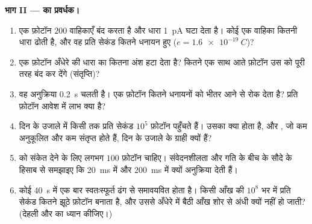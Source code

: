 \begin{problem}
\medskip
\noindent\textbf{भाग II ---  का प्रवर्धक।}
\begin{enumerate}[resume]
  \item एक फ़ोटॉन $200$ वाहिकाएँ बंद करता है और धारा \qty{1}{pA} घटा
        देता है। कोई एक वाहिका कितनी धारा ढोती है, और वह प्रति सेकंड
        कितने धनायन हुए ($e = \qty{1.6e-19}{C}$)?
  \item एक फ़ोटॉन अँधेरे की धारा का कितना अंश हटा देता है? कितने एक साथ
        आते फ़ोटॉन उस  को पूरी तरह बंद कर देंगे (संतृप्ति)?
  \item वह अनुक्रिया \qty{0.2}{s} चलती है। एक फ़ोटॉन कितने धनायनों को
        भीतर आने से रोक देता है? प्रति फ़ोटॉन आवेश में लाभ क्या है?
  \item दिन के उजाले में किसी  तक प्रति सेकंड $10^{5}$ फ़ोटॉन
        पहुँचते हैं। उसका क्या होता है, और , जो कम अनुकूलित और कम
        संतृप्त होते हैं, दिन के उजाले के ग्राही क्यों हैं?
  \item {} को संकेत देने के लिए लगभग $100$ फ़ोटॉन चाहिए।
        संवेदनशीलता और गति के बीच के सौदे के हिसाब से समझाइए कि 
        \qty{20}{ms} में और  \qty{200}{ms} में क्यों अनुक्रिया
        देती हैं।
  \item कोई  \qty{40}{s} में एक बार स्वतःस्फूर्त ढंग से
        समावयवित होता है। किसी आँख की $10^{8}$  भर में
         प्रति सेकंड कितने झूठे फ़ोटॉन बनाता है, और उससे
        अँधेरे में बैठी आँख शोर से अंधी क्यों नहीं हो जाती? (देहली और
         का ध्यान कीजिए।)
\end{enumerate}


\end{problem}

